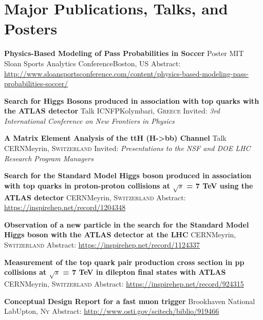 \section{\textbf{Major Publications, Talks, and Posters}}

{\textbf{Physics-Based Modeling of Pass Probabilities in Soccer}}
{Poster}
{MIT Sloan Sports Analytics Conference}{Boston, \textsc{US}}
{\hspace{4mm}Abstract: \url{http://www.sloansportsconference.com/content/physics-based-modeling-pass-probabilities-soccer/}}

{\textbf{Search for Higgs Bosons produced in association with top quarks with the ATLAS detector}}
{Talk}
{ICNFP}{Kolymbari, \textsc{Greece}}
{\hspace{4mm}Invited: \textit{3rd International Conference on New Frontiers in Physics}}

{\textbf{A Matrix Element Analysis of the ttH (H->bb) Channel}}
{Talk}
{CERN}{Meyrin, \textsc{Switzerland}}
{\hspace{4mm}Invited: \textit{Presentations to the NSF and DOE LHC Research Program Managers} }

{\textbf{Search for the Standard Model Higgs boson produced in association with top quarks in proton-proton collisions at $\sqrt{s}$ = 7 TeV using the ATLAS detector}}
{}
{CERN}{Meyrin, \textsc{Switzerland}}
{\hspace{4mm}Abstract: \url{https://inspirehep.net/record/1204348}}

{\textbf{Observation of a new particle in the search for the Standard Model Higgs boson with the ATLAS detector at the LHC}}
{}
{CERN}{Meyrin, \textsc{Switzerland}}
{\hspace{4mm}Abstract: \url{https://inspirehep.net/record/1124337}}

{\textbf{Measurement of the top quark pair production cross section in pp collisions at $\sqrt{s}$ = 7 TeV in dilepton final states with ATLAS}}
{}
{CERN}{Meyrin, \textsc{Switzerland}}
{\hspace{4mm}Abstract: \url{https://inspirehep.net/record/924315}}

{\textbf{ Conceptual Design Report for a fast muon trigger}}
{}
{Brookhaven National Lab}{Upton, \textsc{Ny}}
{\hspace{4mm}Abstract: \url{http://www.osti.gov/scitech/biblio/919466}}

